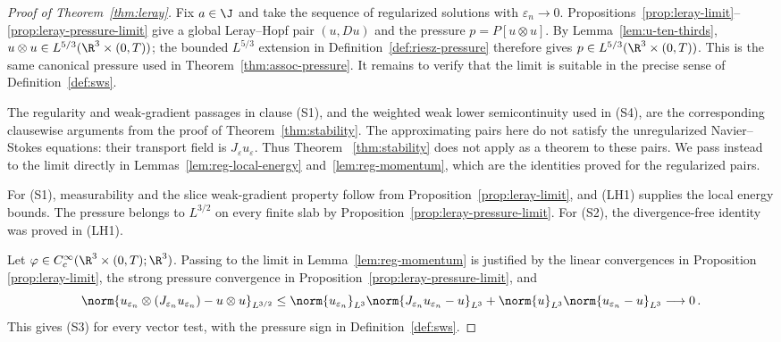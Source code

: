 \documentclass[11pt,reqno]{amsart}
\begin{document}
\begin{proof}[Proof of Theorem~\ref{thm:leray}]
Fix $a\in\J$ and take the sequence of regularized solutions with
$\varepsilon_n\to0$. Propositions~\ref{prop:leray-limit}--
\ref{prop:leray-pressure-limit} give a global Leray--Hopf pair $(u,Du)$ and
the pressure $p=P[u\otimes u]$. By Lemma~\ref{lem:u-ten-thirds},
$u\otimes u\in L^{5/3}(\R^3\times(0,T))$; the bounded $L^{5/3}$ extension
in Definition~\ref{def:riesz-pressure} therefore gives
$p\in L^{5/3}(\R^3\times(0,T))$. This is the same canonical pressure used
in Theorem~\ref{thm:assoc-pressure}. It remains to verify that the limit is
suitable in the precise sense of Definition~\ref{def:sws}.

The regularity and weak-gradient passages in clause (S1), and the weighted
weak lower semicontinuity used in (S4), are the corresponding clausewise
arguments from the proof of Theorem~\ref{thm:stability}. The approximating
pairs here do not satisfy the unregularized Navier--Stokes equations: their
transport field is $J_\varepsilon u_\varepsilon$. Thus Theorem~
\ref{thm:stability} does not apply as a theorem to these pairs. We pass
instead to the limit directly in Lemmas~\ref{lem:reg-local-energy} and~\ref{lem:reg-momentum}, which are the identities
proved for the regularized pairs.

For (S1), measurability and the slice weak-gradient property follow from
Proposition~\ref{prop:leray-limit}, and (LH1) supplies the local energy
bounds. The pressure belongs to $L^{3/2}$ on every finite slab by
Proposition~\ref{prop:leray-pressure-limit}. For (S2), the divergence-free
identity was proved in (LH1).

Let $\varphi\in C_c^\infty(\R^3\times(0,T);\R^3)$. Passing to the limit
in Lemma~\ref{lem:reg-momentum} is justified by the linear convergences in Proposition~
\ref{prop:leray-limit}, the strong pressure convergence in
Proposition~\ref{prop:leray-pressure-limit}, and
\begin{equation}\label{eq:leray-NS-transport-limit}
\norm{u_{\varepsilon_n}\otimes(J_{\varepsilon_n}u_{\varepsilon_n})
             -u\otimes u}_{L^{3/2}}
 \le 
\norm{u_{\varepsilon_n}}_{L^3}
\norm{J_{\varepsilon_n}u_{\varepsilon_n}-u}_{L^3}
       +
\norm{u}_{L^3}
\norm{u_{\varepsilon_n}-u}_{L^3}
 \longrightarrow0\,.
\end{equation}
This gives (S3) for every vector test, with the pressure sign in
Definition~\ref{def:sws}.


\end{proof}
\end{document}
